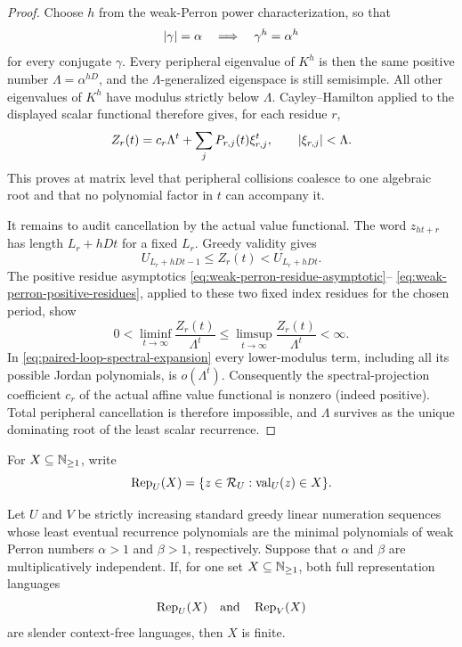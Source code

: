 \begin{proof}
  Choose \(h\) from the weak-Perron power characterization, so that
  \[
    \lvert \gamma \rvert=\alpha\quad\Longrightarrow\quad
    \gamma^h=\alpha^h
  \]
  for every conjugate \(\gamma\). Every peripheral eigenvalue of \(K^h\) is then
  the same positive number
  \(
    \Lambda=\alpha^{hD}
  \), and the \(\Lambda\)-generalized eigenspace is still semisimple.
  All other eigenvalues of \(K^h\) have modulus strictly below
  \(\Lambda\). Cayley--Hamilton applied to the displayed scalar functional
  therefore gives, for each residue \(r\),
  \begin{equation}
    Z_r(t)=c_r\Lambda^t+
      \sum_j P_{r,j}(t)\xi_{r,j}^t,
    \qquad \lvert \xi_{r,j} \rvert<\Lambda.
    \label{eq:paired-loop-spectral-expansion}
  \end{equation}
  This proves at matrix level that peripheral collisions coalesce to one
  algebraic root and that no polynomial factor in \(t\) can accompany it.

  It remains to audit cancellation by the actual value functional. The
  word \(z_{ht+r}\) has length \(L_r+hDt\) for a fixed \(L_r\). Greedy
  validity gives
  \[
    U_{L_r+hDt-1}\le Z_r(t)<U_{L_r+hDt}.
  \]
  The positive residue asymptotics
  \eqref{eq:weak-perron-residue-asymptotic}--
  \eqref{eq:weak-perron-positive-residues}, applied to these two fixed
  index residues for the chosen period, show
  \[
    0<\liminf_{t\to\infty}\frac{Z_r(t)}{\Lambda^t}
      \le
      \limsup_{t\to\infty}\frac{Z_r(t)}{\Lambda^t}<\infty.
  \]
  In \eqref{eq:paired-loop-spectral-expansion} every lower-modulus term,
  including all its possible Jordan polynomials, is \(o(\Lambda^t)\).
  Consequently the spectral-projection coefficient \(c_r\) of the actual
  affine value functional is nonzero (indeed positive). Total peripheral
  cancellation is therefore impossible, and \(\Lambda\) survives as the
  unique dominating root of the least scalar recurrence.
\end{proof}

For \(X\subseteq\mathbb{N}_{\ge1}\), write
\[
  \operatorname{Rep}_U(X)
    =\{z\in\mathcal R_U:\operatorname{val}_U(z)\in X\}.
\]

\begin{theorem}
  \label{thm:slender-cfl-cobham}
  Let \(U\) and \(V\) be strictly increasing standard greedy linear
  numeration sequences whose least eventual recurrence polynomials are the
  minimal polynomials of weak Perron numbers \(\alpha>1\) and \(\beta>1\),
  respectively. Suppose that \(\alpha\) and \(\beta\) are multiplicatively
  independent. If, for one set \(X\subseteq\mathbb{N}_{\ge1}\), both full
  representation languages
  \[
    \operatorname{Rep}_U(X)
    \quad\hbox{and}\quad
    \operatorname{Rep}_V(X)
  \]
  are slender context-free languages, then \(X\) is finite.
\end{theorem}

